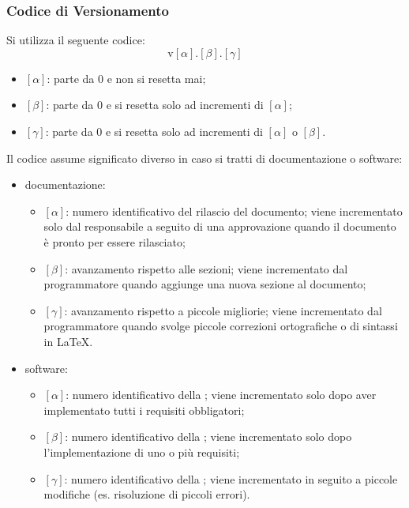     \subsubsection{Codice di Versionamento}
    Si utilizza il seguente codice:
    \[
        \text{v}[\alpha].[\beta].[\gamma]
    \]
    \begin{itemize}
        \item \([\alpha]\): parte da 0 e non si resetta mai;
        \item \([\beta]\): parte da 0 e si resetta solo ad incrementi di \([\alpha]\);
        \item \([\gamma]\): parte da 0 e si resetta solo ad incrementi di \([\alpha]\) o \([\beta]\).
    \end{itemize}
    Il codice assume significato diverso in caso si tratti di documentazione o software:
    \begin{itemize}
        \item documentazione:
        \begin{itemize}
            \item \([\alpha]\): numero identificativo del rilascio del documento; viene incrementato solo dal responsabile a seguito di una approvazione quando il documento è pronto per essere rilasciato;
            \item \([\beta]\): avanzamento rispetto alle sezioni; viene incrementato dal programmatore quando aggiunge una nuova sezione al documento;
            \item \([\gamma]\): avanzamento rispetto a piccole migliorie; viene incrementato dal programmatore quando svolge piccole correzioni ortografiche o di sintassi in \LaTeX.
        \end{itemize}

        \item software:
        \begin{itemize}
            \item \([\alpha]\): numero identificativo della ; viene incrementato solo dopo aver implementato tutti i requisiti obbligatori;
            \item \([\beta]\): numero identificativo della ; viene incrementato solo dopo l'implementazione di uno o più requisiti;
            \item \([\gamma]\): numero identificativo della ; viene incrementato in seguito a piccole modifiche (es. risoluzione di piccoli errori).
            \end{itemize}
    \end{itemize}

